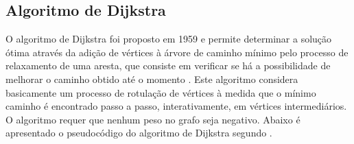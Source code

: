 \subsection{Algoritmo de Dijkstra}
O algoritmo de Dijkstra foi proposto em 1959 e permite determinar a solução ótima através da adição de
vértices à árvore de caminho mínimo pelo processo de relaxamento de uma aresta, que consiste em verificar
se há a possibilidade de melhorar o caminho obtido até o momento \cite{boaventura}. Este algoritmo considera
basicamente um processo de rotulação de vértices à medida que o mínimo caminho é encontrado passo a passo,
interativamente, em vértices intermediários. O algoritmo requer que nenhum peso no grafo seja negativo. Abaixo
é apresentado o pseudocódigo do algoritmo de Dijkstra segundo \cite{cormen}.

